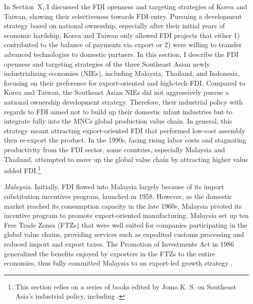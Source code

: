 In Section~X, I discussed the FDI openness and targeting strategies of Korea and
Taiwan, showing their selectiveness towards FDI entry. Pursuing a development
strategy based on national ownership, especially after their initial years of
economic hardship, Korea and Taiwan only allowed FDI projects that either 1)
contributed to the balance of payments via export or 2) were willing to transfer
advanced technologies to domestic partners. In this section, I describe the FDI
openness and targeting strategies of the three Southeast Asian newly
industrializing economies (NIEs), including Malaysia, Thailand, and Indonesia,
focusing on their preference for export-oriented and high-tech FDI. Compared to
Korea and Taiwan, the Southeast Asian NIEs did not aggressively pursue a
national ownership development strategy. Therefore, their industrial policy with
regards to FDI aimed not to build up their domestic infant industries but to
integrate fully into the MNCs global production value chain. In general, this
strategy meant attracting export-oriented FDI that performed low-cost assembly
then re-export the product. In the 1990s, facing rising labor costs and
stagnating productivity from the FDI sector, some countries, especially Malaysia
and Thailand, attempted to move up the global value chain by attracting higher
value added FDI.\footnote{This section relies on a series of books edited by
  Jomo K. S. on Southeast Asia's industrial policy, including \citet{Jomo1997,
    Jomo2001, Jomo2003}.}

\textit{Malaysia}. Initially, FDI flowed into Malaysia largely because of its
import substitution incentives program, launched in 1958. However, as the
domestic market reached its consumption capacity in the late 1960s, Malaysia
pivoted its incentive program to promote export-oriented manufacturing. Malaysia
set up ten Free Trade Zones (FTZs) that were well suited for companies
participating in the global value chains, providing services such as expedited
customs processing and reduced import and export taxes. The Promotion of
Investments Act in 1986 generalized the benefits enjoyed by exporters in the
FTZs to the entire economies, thus fully committed Malaysia to an export-led
growth strategy \citep[96-100]{Jomo2003}.

